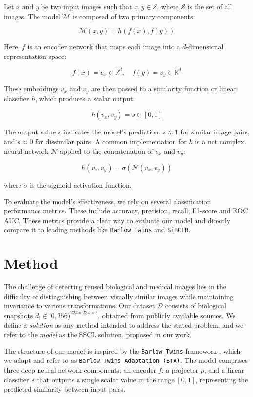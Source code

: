 \documentclass{article}
\begin{document}
Let $x$ and $y$ be two input images such that $x, y \in \mathcal{S}$, where $\mathcal{S}$ is the set of all images. The model $\mathcal{M}$ is composed of two primary components:

$$ \mathcal{M}(x, y) = h(f(x), f(y)) $$

Here, $f$ is an encoder network that maps each image into a $d$-dimensional representation space:

$$ f(x) = v_x \in \mathbb{R}^{d}, \quad f(y) = v_y \in \mathbb{R}^{d} $$

These embeddings $v_x$ and $v_y$ are then passed to a similarity function or linear classifier $h$, which produces a scalar output:

\[
h(v_x, v_y) = s \in [0, 1]
\]

The output value $s$ indicates the model’s prediction: $s \approx 1$ for similar image pairs, and $s \approx 0$ for dissimilar pairs. A common implementation for $h$ is a not complex neural network $\mathcal{N}$ applied to the concatenation of $v_x$ and $v_y$:

$$ h(v_x, v_y) = \sigma(\mathcal{N}(v_x, v_y)) $$

where $\sigma$ is the sigmoid activation function.

To evaluate the model's effectiveness, we rely on several classification performance metrics. These include accuracy, precision, recall, F1-score and ROC AUC. These metrics provide a clear way to evaluate our model and directly compare it to leading methods like \texttt{Barlow Twins} and \texttt{SimCLR}.

\section{Method}

The challenge of detecting reused biological and medical images lies in the difficulty of
distinguishing between visually similar images while maintaining invariance to various 
transformations. Our dataset $\mathcal{D}$ consists of biological snapshots 
$d_i \in [0, 256)^{224 \times 224 \times 3}$, obtained from publicly available sources. 
We define a \textit{solution} as any method intended to address the stated problem, 
and we refer to the \textit{model} as the SSCL solution, proposed in our work.

The structure of our model is inspired by the \texttt{Barlow Twins} framework \cite{zbontar2021barlow}, which we adapt and refer to as \texttt{Barlow Twins Adaptation (BTA)}. The model comprises three deep neural network components: an encoder $f$, a projector $p$, and a linear classifier $s$ that outputs a single scalar value in the range $[0,1]$, representing the predicted similarity between input pairs.
\end{document}

